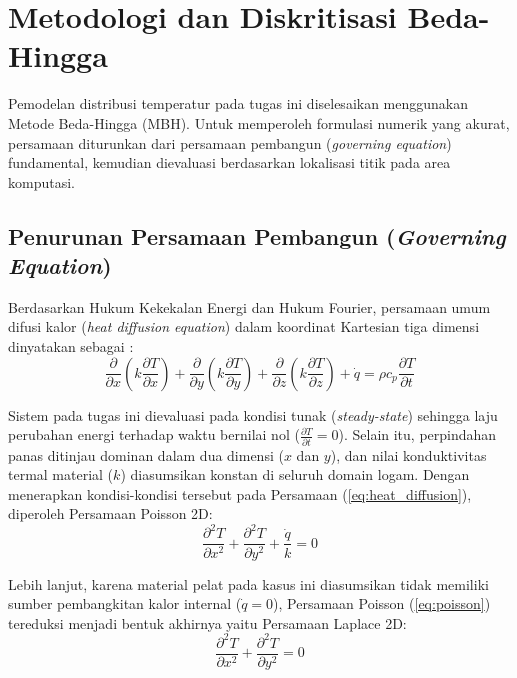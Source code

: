 \documentclass[12pt,a4paper]{article}
\begin{document}
\section{Metodologi dan Diskritisasi Beda-Hingga}
Pemodelan distribusi temperatur pada tugas ini diselesaikan menggunakan Metode Beda-Hingga (MBH). Untuk memperoleh formulasi numerik yang akurat, persamaan diturunkan dari persamaan pembangun (\textit{governing equation}) fundamental, kemudian dievaluasi berdasarkan lokalisasi titik pada area komputasi.

\subsection{Penurunan Persamaan Pembangun (\textit{Governing Equation})}
Berdasarkan Hukum Kekekalan Energi dan Hukum Fourier, persamaan umum difusi kalor (\textit{heat diffusion equation}) dalam koordinat Kartesian tiga dimensi dinyatakan sebagai \cite{incropera_principles_2013}:
\begin{equation} \label{eq:heat_diffusion}
    \frac{\partial}{\partial x} \left( k \frac{\partial T}{\partial x} \right) + \frac{\partial}{\partial y} \left( k \frac{\partial T}{\partial y} \right) + \frac{\partial}{\partial z} \left( k \frac{\partial T}{\partial z} \right) + \dot{q} = \rho c_p \frac{\partial T}{\partial t}
\end{equation}

Sistem pada tugas ini dievaluasi pada kondisi tunak (\textit{steady-state}) sehingga laju perubahan energi terhadap waktu bernilai nol ($\frac{\partial T}{\partial t} = 0$). Selain itu, perpindahan panas ditinjau dominan dalam dua dimensi ($x$ dan $y$), dan nilai konduktivitas termal material ($k$) diasumsikan konstan di seluruh domain logam. Dengan menerapkan kondisi-kondisi tersebut pada Persamaan (\ref{eq:heat_diffusion}), diperoleh Persamaan Poisson 2D:
\begin{equation} \label{eq:poisson}
    \frac{\partial^2 T}{\partial x^2} + \frac{\partial^2 T}{\partial y^2} + \frac{\dot{q}}{k} = 0
\end{equation}

Lebih lanjut, karena material pelat pada kasus ini diasumsikan tidak memiliki sumber pembangkitan kalor internal ($\dot{q} = 0$), Persamaan Poisson (\ref{eq:poisson}) tereduksi menjadi bentuk akhirnya yaitu Persamaan Laplace 2D:
\begin{equation} \label{eq:laplace}
    \frac{\partial^2 T}{\partial x^2} + \frac{\partial^2 T}{\partial y^2} = 0
\end{equation}
\end{document}
